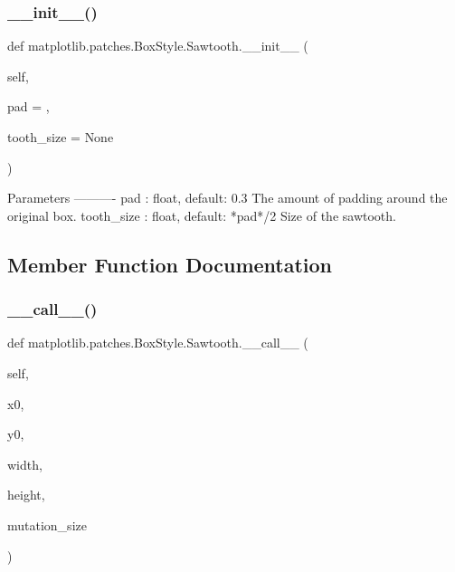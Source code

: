 \subsubsection{\texorpdfstring{\+\_\+\+\_\+init\+\_\+\+\_\+()}{\_\_init\_\_()}}
{\footnotesize\ttfamily def matplotlib.\+patches.\+Box\+Style.\+Sawtooth.\+\_\+\+\_\+init\+\_\+\+\_\+ (\begin{DoxyParamCaption}\item[{}]{self,  }\item[{}]{pad = {},  }\item[{}]{tooth\+\_\+size = {\ttfamily None} }\end{DoxyParamCaption})}

\begin{DoxyVerb}Parameters
----------
pad : float, default: 0.3
    The amount of padding around the original box.
tooth_size : float, default: *pad*/2
    Size of the sawtooth.
\end{DoxyVerb}
 

\subsection{Member Function Documentation}
\mbox{\label{classmatplotlib_1_1patches_1_1BoxStyle_1_1Sawtooth_a49e23af14c9b1b57812650fe787c54d7}} 
\subsubsection{\texorpdfstring{\+\_\+\+\_\+call\+\_\+\+\_\+()}{\_\_call\_\_()}}
{\footnotesize\ttfamily def matplotlib.\+patches.\+Box\+Style.\+Sawtooth.\+\_\+\+\_\+call\+\_\+\+\_\+ (\begin{DoxyParamCaption}\item[{}]{self,  }\item[{}]{x0,  }\item[{}]{y0,  }\item[{}]{width,  }\item[{}]{height,  }\item[{}]{mutation\+\_\+size }\end{DoxyParamCaption})}



